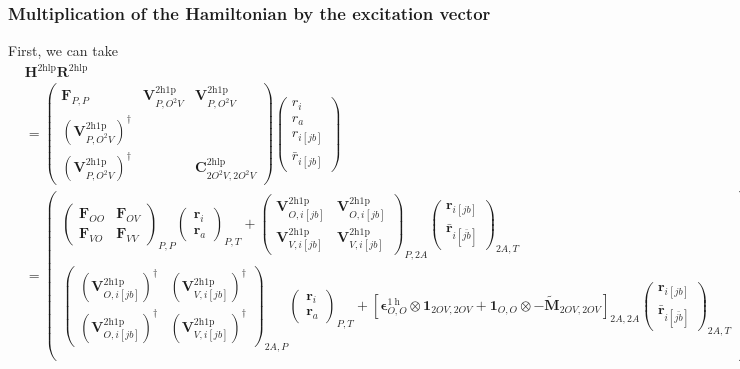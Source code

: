 \subsubsection{Multiplication of the Hamiltonian by the excitation vector}
First, we can take
\begin{align}
&\bm{H}^{2 \mathrm{hlp}} \bm{R}^{2 \mathrm{hlp}}\\
&=
    \begin{pmatrix}
        \bm{F}_{P,P} & \bm{V}^{2\mathrm{h1p}}_{P,O^2V} & \bm{V}^{2\mathrm{h1p}}_{P,O^2V} \\
        \left(\bm{V}^{2\mathrm{h1p}}_{P,O^2V}\right)^{\dagger} &  &  \\
        \left(\bm{V}^{2\mathrm{h1p}}_{P,O^2V}\right)^{\dagger} &  & \bm{C}^{2\mathrm{hlp}}_{2O^2V,2O^2V}
    \end{pmatrix}
    \begin{pmatrix}
        r_i \\
        r_a \\
        r_{i[jb]} \\
        \bar{r}_{i[jb]}
    \end{pmatrix} \\
&=
    \begin{pmatrix}
\begin{pmatrix}
        \bm{F}_{OO} & \bm{F}_{OV} \\ \bm{F}_{VO} & \bm{F}_{VV}
\end{pmatrix}_{P,P} \begin{pmatrix}
\bm{r}_i \\ \bm{r}_a
\end{pmatrix}_{P,T} + \begin{pmatrix}
\bm{V}^{2 \mathrm{h1p}}_{O,i[jb]} & \bm{V}^{2 \mathrm{h1p}}_{O,i[{jb}]} \\ \bm{V}^{2 \mathrm{h1p}}_{V,i[jb]} & \bm{V}^{2 \mathrm{h1p}}_{V,i[{jb}]} 
\end{pmatrix}_{P,2A} \begin{pmatrix}
    \bm{r}_{i[jb]} \\
\bm{\bar{r}}_{i[\bar{jb}]}
\end{pmatrix}_{2A,T}  \\
        \begin{pmatrix}
\left(\bm{V}^{2 \mathrm{h1p}}_{O,i[jb]}\right)^{\dagger} & \left(\bm{V}^{2 \mathrm{h1p}}_{V,i[{jb}]}\right)^{\dagger} \\ \left(\bm{V}^{2 \mathrm{h1p}}_{O,i[jb]}\right)^{\dagger} & \left(\bm{V}^{2 \mathrm{h1p}}_{V,i[{jb}]}\right)^{\dagger} 
\end{pmatrix}_{2A,P} \begin{pmatrix}
\bm{r}_i \\ \bm{r}_a
\end{pmatrix}_{P,T} + \left[ \bm{\epsilon}^{1 \mathrm{~h}}_{O,O} \otimes \bm{1}_{2OV,2OV} + \bm{1}_{O,O} \otimes -\tilde{\bm{M}}_{2OV,2OV} \right]_{2A,2A} \begin{pmatrix}
    \bm{r}_{i[jb]} \\
\bm{\bar{r}}_{i[\bar{jb}]}
\end{pmatrix}_{2A,T} \\
\end{pmatrix}
\end{align}
